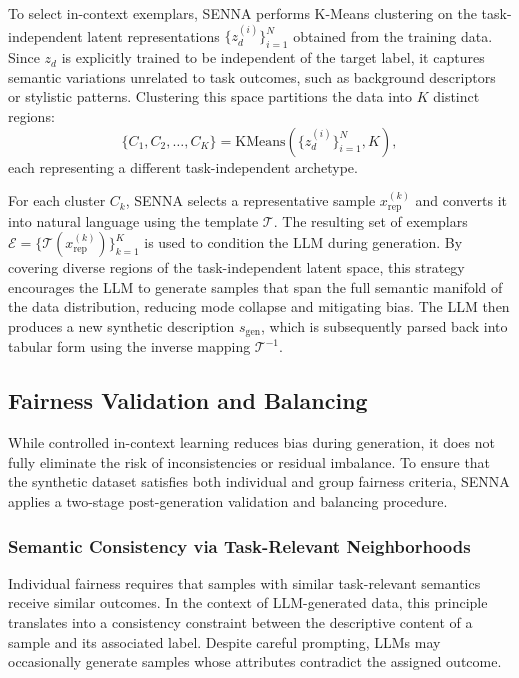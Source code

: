 \documentclass[runningheads]{llncs}
\begin{document}
To select in-context exemplars, SENNA performs K-Means clustering on the task-independent latent
representations $\{z_d^{(i)}\}_{i=1}^N$ obtained from the training data.
Since $z_d$ is explicitly trained to be independent of the target label, it captures semantic
variations unrelated to task outcomes, such as background descriptors or stylistic patterns.
Clustering this space partitions the data into $K$ distinct regions:
\begin{equation}
\{C_1, C_2, \ldots, C_K\} = \mathrm{KMeans}(\{z_d^{(i)}\}_{i=1}^N, K),
\end{equation}
each representing a different task-independent archetype.

For each cluster $C_k$, SENNA selects a representative sample $x^{(k)}_{\mathrm{rep}}$ and converts
it into natural language using the template $\mathcal{T}$.
The resulting set of exemplars $\mathcal{E} = \{\mathcal{T}(x^{(k)}_{\mathrm{rep}})\}_{k=1}^K$ is used
to condition the LLM during generation.
By covering diverse regions of the task-independent latent space, this strategy encourages the
LLM to generate samples that span the full semantic manifold of the data distribution, reducing
mode collapse and mitigating bias.
The LLM then produces a new synthetic description $s_{\mathrm{gen}}$, which is subsequently parsed
back into tabular form using the inverse mapping $\mathcal{T}^{-1}$.

\subsection{Fairness Validation and Balancing}

While controlled in-context learning reduces bias during generation, it does not fully eliminate
the risk of inconsistencies or residual imbalance.
To ensure that the synthetic dataset satisfies both individual and group fairness criteria,
SENNA applies a two-stage post-generation validation and balancing procedure.

\subsubsection{Semantic Consistency via Task-Relevant Neighborhoods}

Individual fairness requires that samples with similar task-relevant semantics receive similar
outcomes.
In the context of LLM-generated data, this principle translates into a consistency constraint
between the descriptive content of a sample and its associated label.
Despite careful prompting, LLMs may occasionally generate samples whose attributes contradict the
assigned outcome.
\end{document}
